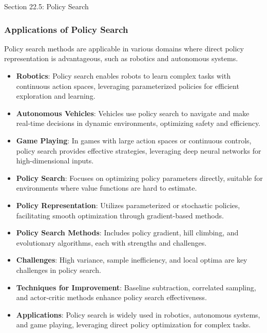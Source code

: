 \begin{notes}{Section 22.5: Policy Search}
\begin{highlight}
    \end{highlight}
    
    \subsubsection*{Applications of Policy Search}
    
    Policy search methods are applicable in various domains where direct policy representation is advantageous, such as robotics and autonomous systems.
    
    \begin{highlight}
    
        \begin{itemize}
            \item \textbf{Robotics}: Policy search enables robots to learn complex tasks with continuous action spaces, leveraging parameterized policies for efficient exploration and learning.
            \item \textbf{Autonomous Vehicles}: Vehicles use policy search to navigate and make real-time decisions in dynamic environments, optimizing safety and efficiency.
            \item \textbf{Game Playing}: In games with large action spaces or continuous controls, policy search provides effective strategies, leveraging deep neural networks for high-dimensional inputs.
        \end{itemize}
    
    \end{highlight}
    
    \begin{highlight}
    
        \begin{itemize}
            \item \textbf{Policy Search}: Focuses on optimizing policy parameters directly, suitable for environments where value functions are hard to estimate.
            \item \textbf{Policy Representation}: Utilizes parameterized or stochastic policies, facilitating smooth optimization through gradient-based methods.
            \item \textbf{Policy Search Methods}: Includes policy gradient, hill climbing, and evolutionary algorithms, each with strengths and challenges.
            \item \textbf{Challenges}: High variance, sample inefficiency, and local optima are key challenges in policy search.
            \item \textbf{Techniques for Improvement}: Baseline subtraction, correlated sampling, and actor-critic methods enhance policy search effectiveness.
            \item \textbf{Applications}: Policy search is widely used in robotics, autonomous systems, and game playing, leveraging direct policy optimization for complex tasks.
        \end{itemize}
    

\end{highlight}
\end{notes}
